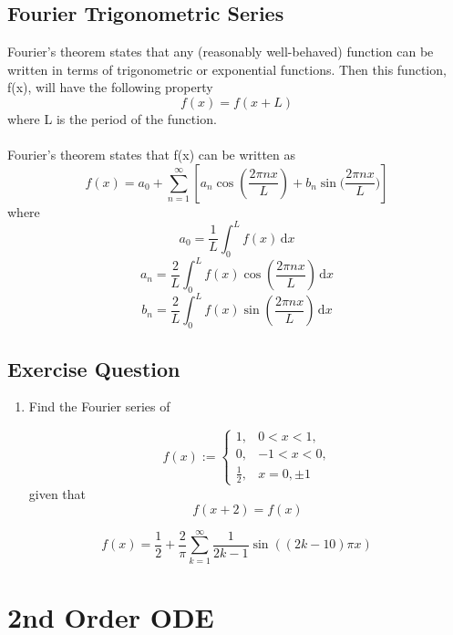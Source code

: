 \documentclass[a4paper,12pt,oneside]{book}
\begin{document}
 \subsection{Fourier Trigonometric Series}
 Fourier’s theorem states that any (reasonably well-behaved) function can be written in terms of trigonometric or exponential functions.  Then this function, f(x), will have the following property 
 $$f(x) = f(x+L)$$ 
 where L is the period of the function.\\\\
 Fourier’s theorem states that f(x) can be written as
$$f(x) = a_0+\sum_{n=1}^{\infty} [a_n \cos({\frac{2\pi nx}{L}})+b_n \sin({\frac{2\pi nx}{L})}]$$
where
$$a_0 = \frac{1}{L}\int_0^L \! f(x) \, \mathrm{d}x$$
$$a_n = \frac{2}{L}\int_0^L \! f(x) \cos({\frac{2\pi nx}{L}}) \, \mathrm{d}x$$
$$b_n = \frac{2}{L}\int_0^L \! f(x) \sin({\frac{2\pi nx}{L}}) \, \mathrm{d}x$$
\subsection{Exercise Question}

\begin{enumerate}
    \item Find the Fourier series of
  
    $$f(x) :=
    \begin{cases}
    1, & 0 < x < 1, \\
    0, & -1 < x < 0, \\
    \frac{1}{2}, & x=0,\pm 1
    \end{cases}$$
    given that $$f(x+2)=f(x)$$
\end{enumerate}

$$f(x)=\frac{1}{2}+\frac{2}{\pi}\sum_{k=1}^{\infty}\frac{1}{2k-1}\sin{((2k-10)\pi x)}$$
\section{2nd Order ODE}
\end{document}

